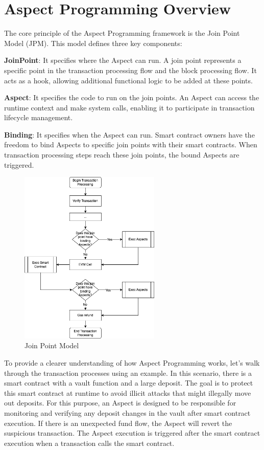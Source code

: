 
\section{Aspect Programming Overview}
The core principle of the Aspect Programming framework is the Join Point Model (JPM). This model defines three key components:

\textbf{JoinPoint}: It specifies where the Aspect can run. A join point represents a specific point in the transaction processing flow and the block processing flow. It acts as a hook, allowing additional functional logic to be added at these points.

\textbf{Aspect}: It specifies the code to run on the join points. An Aspect can access the runtime context and make system calls, enabling it to participate in transaction lifecycle management.

\textbf{Binding}: It specifies when the Aspect can run. Smart contract owners have the freedom to bind Aspects to specific join points with their smart contracts. When transaction processing steps reach these join points, the bound Aspects are triggered.

\begin{figure}[h]
  \centering
  \includegraphics[width=0.6\textwidth]{sections/join-point-model-overview.png}
  \caption{Join Point Model}
\end{figure}

To provide a clearer understanding of how Aspect Programming works, let's walk through the transaction processes using an example. In this scenario, there is a smart contract with a vault function and a large deposit. The goal is to protect this smart contract at runtime to avoid illicit attacks that might illegally move out deposits. For this purpose, an Aspect is designed to be responsible for monitoring and verifying any deposit changes in the vault after smart contract execution. If there is an unexpected fund flow, the Aspect will revert the suspicious transaction. The Aspect execution is triggered after the smart contract execution when a transaction calls the smart contract.

